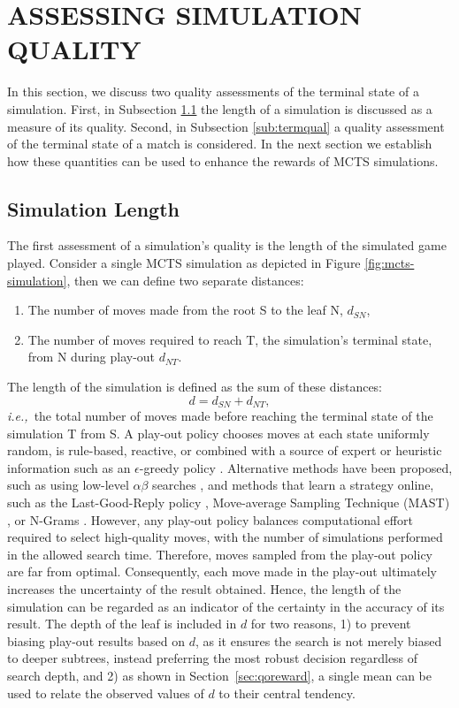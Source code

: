\documentclass{ecai2014}
\newcommand{\node}[1]{{\fontfamily{phv}\selectfont#1}}
\newcommand{\ie}{{\it i.e.,}~}
\begin{document}
\section{ASSESSING SIMULATION QUALITY}
\label{sec:poqual}
In this section, we discuss two quality assessments of the terminal state of a simulation. First, in Subsection \ref{sub:simdur} the length of a simulation is discussed as a measure of its quality. Second, in Subsection \ref{sub:termqual} a quality assessment of the terminal state of a match is considered. In the next section we establish how these quantities can be used to enhance the rewards of MCTS simulations. 

\subsection{Simulation Length} 
\label{sub:simdur}
The first assessment of a simulation's quality is the length of the simulated game played. Consider a single MCTS simulation as depicted in Figure \ref{fig:mcts-simulation}, then we can define two separate distances: 
\begin{enumerate}
\item The number of moves made from the root \node{S} to the leaf \node{N}, $d_{SN}$,
\item The number of moves required to reach \node{T}, the simulation's terminal state, from \node{N} during play-out $d_{NT}$.
\end{enumerate}
The length of the simulation is defined as the sum of these distances:
\begin{equation}
d = d_{SN} + d_{NT},
\label{eq:m_ST}
\end{equation}
\ie the total number of moves made before reaching the terminal state of the simulation {\node{T}} from {\node{S}}. A play-out policy chooses moves at each state uniformly random, is rule-based, reactive, or combined with a source of expert or heuristic information such as an $\epsilon$-greedy policy \cite{sturtevant2008analysis, sutton1998reinforcement}. Alternative methods have been proposed, such as using low-level $\alpha\beta$ searches \cite{Winands2011}, and methods that learn a strategy online, such as the Last-Good-Reply policy \cite{baier2010power}, Move-average Sampling Technique (MAST) \cite{finnsson2008simulation}, or N-Grams \cite{Tak2012}. However, any play-out policy balances computational effort required to select high-quality moves, with the number of simulations performed in the allowed search time. Therefore, moves sampled from the play-out policy are far from optimal. Consequently, each move made in the play-out ultimately increases the uncertainty of the result obtained. Hence, the length of the simulation can be regarded as an indicator of the certainty in the accuracy of its result. The depth of the leaf is included in $d$ for two reasons, 1) to prevent biasing play-out results based on $d$, as it ensures the search is not merely biased to deeper subtrees, instead preferring the most robust decision regardless of search depth, and 2) as shown in Section~{\ref{sec:qoreward}}, a single mean can be used to relate the observed values of $d$ to their central tendency.
\end{document}
